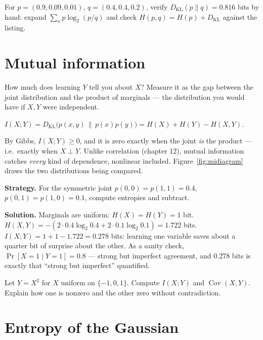\begin{exercise}[medium]
For $p=(0.9,0.09,0.01)$, $q=(0.4,0.4,0.2)$, verify
$D_{\mathrm{KL}}(p\|q)=0.816$ bits by hand: expand
$\sum_{x} p\log_2(p/q)$ and check $H(p,q)=H(p)+D_{\mathrm{KL}}$ against the
listing.
\end{exercise}

\section{Mutual information}\label{sec:info-mi}

How much does learning $Y$ tell you about $X$? Measure it as the gap
between the joint distribution and the product of marginals --- the
distribution you would have if $X,Y$ were independent.

\begin{definition}\label{def:mi}
$I(X;Y) = D_{\mathrm{KL}}\big(p(x,y)\,\|\,p(x)p(y)\big)
= H(X) + H(Y) - H(X,Y)$.
\end{definition}

By Gibbs, $I(X;Y)\ge0$, and it is zero exactly when the joint \emph{is}
the product --- i.e.\ exactly when $X\perp Y$. Unlike correlation
(chapter 12), mutual information catches \emph{every} kind of
dependence, nonlinear included. Figure~\ref{fig:midiagram} draws the
two distributions being compared.

\begin{example}\label{ex:mi}
\textbf{Strategy.} For the symmetric joint
$p(0,0)=p(1,1)=0.4$, $p(0,1)=p(1,0)=0.1$, compute entropies and
subtract.

\textbf{Solution.} Marginals are uniform: $H(X)=H(Y)=1$ bit.
$H(X,Y) = -(2\cdot0.4\log_2 0.4 + 2\cdot0.1\log_2 0.1) = 1.722$ bits.
$I(X;Y) = 1 + 1 - 1.722 = 0.278$ bits: learning one variable saves
about a quarter bit of surprise about the other. As a sanity check,
$\Pr[X=1\mid Y=1]=0.8$ --- strong but imperfect agreement, and 0.278
bits is exactly that ``strong but imperfect'' quantified.
\end{example}

\begin{exercise}[hard]
Let $Y=X^2$ for $X$ uniform on $\{-1,0,1\}$. Compute $I(X;Y)$ and
$\operatorname{Cov}(X,Y)$. Explain how one is nonzero and the other
zero without contradiction.
\end{exercise}

\section{Entropy of the Gaussian}\label{sec:info-gauss}

